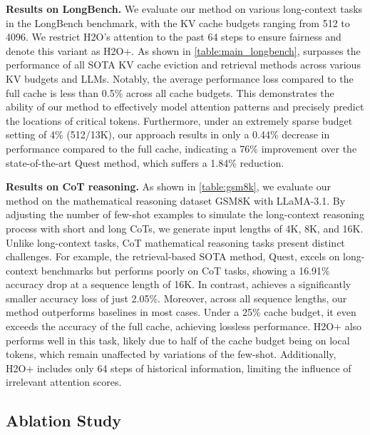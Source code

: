 \textbf{Results on LongBench.} We evaluate our method on various long-context tasks in the LongBench benchmark, with the KV cache budgets ranging from 512 to 4096.
We restrict H2O’s attention to the past 64 steps to ensure fairness and denote this variant as H2O+. 
As shown in \autoref{table:main_longbench}, \ours surpasses the performance of all SOTA KV cache eviction and retrieval methods across various KV budgets and LLMs. Notably, the average performance loss compared to the full cache is less than 0.5\% across all cache budgets. This demonstrates the ability of our method to effectively model attention patterns and precisely predict the locations of critical tokens.
Furthermore, under an extremely sparse budget setting of 4\% (512/13K), our approach results in only a 0.44\% decrease in performance compared to the full cache, indicating a 76\% improvement over the state-of-the-art Quest method, which suffers a 1.84\% reduction.




\textbf{Results on CoT reasoning.}
As shown in \autoref{table:gsm8k}, we evaluate our method on the mathematical reasoning dataset GSM8K with LLaMA-3.1. By adjusting the number of few-shot examples to simulate the long-context reasoning process with short and long CoTs, we generate input lengths of 4K, 8K, and 16K.
Unlike long-context tasks, CoT mathematical reasoning tasks present distinct challenges. For example, the retrieval-based SOTA method, Quest, excels on long-context benchmarks 
but performs poorly on CoT tasks, showing a 16.91\% accuracy drop at a sequence length of 16K. 
In contrast, \ours achieves a significantly smaller accuracy loss of just 2.05\%. Moreover, across all sequence lengths, our method outperforms baselines in most cases. Under a 25\% cache budget, it even exceeds the accuracy of the full cache, achieving lossless performance. 
H2O+ also performs well in this task, likely due to half of the cache budget being on local tokens, which remain unaffected by variations of the few-shot. Additionally, H2O+ includes only 64 steps of historical information, limiting the influence of irrelevant attention scores. 







\subsection{Ablation Study}
\label{sec:exp_ablation}

